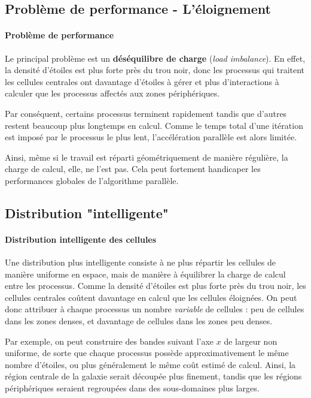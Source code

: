 \documentclass[11pt,a4paper]{article}
\begin{document}

\subsection{Problème de performance - L'éloignement}

\paragraph{Problème de performance}

Le principal problème est un \textbf{déséquilibre de charge} (\textit{load imbalance}). En effet, la densité d'étoiles est plus forte près du trou noir, donc les processus qui traitent les cellules centrales ont davantage d'étoiles à gérer et plus d'interactions à calculer que les processus affectés aux zones périphériques.

Par conséquent, certains processus terminent rapidement tandis que d'autres restent beaucoup plus longtemps en calcul. Comme le temps total d'une itération est imposé par le processus le plus lent, l'accélération parallèle est alors limitée.

Ainsi, même si le travail est réparti géométriquement de manière régulière, la charge de calcul, elle, ne l'est pas. Cela peut fortement handicaper les performances globales de l'algorithme parallèle.

\subsection{Distribution "intelligente"}

\paragraph{Distribution intelligente des cellules}

Une distribution plus intelligente consiste à ne plus répartir les cellules de manière uniforme en espace, mais de manière à équilibrer la charge de calcul entre les processus. Comme la densité d'étoiles est plus forte près du trou noir, les cellules centrales coûtent davantage en calcul que les cellules éloignées. On peut donc attribuer à chaque processus un nombre \emph{variable} de cellules : peu de cellules dans les zones denses, et davantage de cellules dans les zones peu denses.

Par exemple, on peut construire des bandes suivant l'axe \(x\) de largeur non uniforme, de sorte que chaque processus possède approximativement le même nombre d'étoiles, ou plus généralement le même coût estimé de calcul. Ainsi, la région centrale de la galaxie serait découpée plus finement, tandis que les régions périphériques seraient regroupées dans des sous-domaines plus larges.
\end{document}
